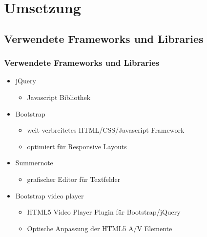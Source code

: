 \documentclass{beamer}
\begin{document}
\section{Umsetzung}
\subsection{Verwendete Frameworks und Libraries}
	\begin{frame}
		\frametitle{Verwendete Frameworks und Libraries}
		\begin{itemize}[<+->]
			\item jQuery\cite{p1}
			\begin{itemize}[<1->]
				\item Javascript Bibliothek
			\end{itemize}
			\item Bootstrap\cite{p2}
			\begin{itemize}[<2->]
				\item weit verbreitetes HTML/CSS/Javascript Framework
				\item optimiert für Responsive Layouts
			\end{itemize}
			\item Summernote\cite{p3}
			\begin{itemize}[<3->]
				\item grafischer Editor für Textfelder
			\end{itemize}
			\item Bootstrap video player\cite{p4}
			\begin{itemize}[<3->]
				\item HTML5 Video Player Plugin für Bootstrap/jQuery
				\item Optische Anpassung der HTML5 A/V Elemente
			\end{itemize}
		\end{itemize}
	\end{frame}
\end{document}
